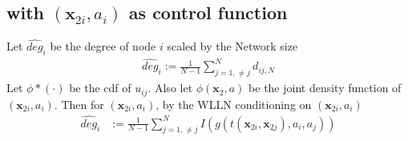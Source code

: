 \documentclass[11pt]{article}
\begin{document}
\subsection{with $(\mathbf{x}_{2i},a_i)$ as control function}
Let $\hat{deg}_i$ be the degree of node $i$ scaled by the Network size
  \begin{align}
\hat{deg}_i := \frac{1}{N-1} \sum_{j=1,\neq j}^{N} d_{ij,N}
  \end{align}
Let $\phi*(\cdot)$ be the cdf of $u_{ij}$. Also let $\phi(\mathbf{x}_2,a)$ be the joint density function of $(\mathbf{x}_{2i},a_{i})$. Then for $(\mathbf{x}_{2i},a_{i})$, by the WLLN conditioning on $(\mathbf{x}_{2i},a_{i})$
\begin{align}
\hat{deg}_i &:= \frac{1}{N-1} \sum_{j=1,\neq j}^{N} I(g(t(\mathbf{x}_{2i},\mathbf{x}_{2j}),a_i,a_j))
\end{align}
\end{document}
